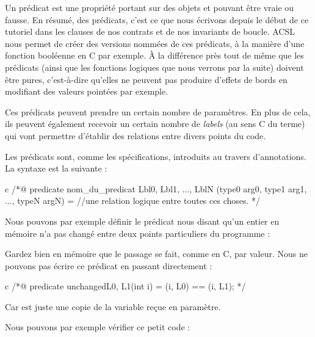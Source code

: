 Un prédicat est une propriété portant sur des objets et pouvant être vraie ou
fausse. En résumé, des prédicats, c'est ce que nous écrivons depuis le début de
ce tutoriel dans les clauses de nos contrats et de nos invariants de boucle.
ACSL nous permet de créer des versions nommées de ces prédicats, à la manière
d'une fonction booléenne en C par exemple. À la différence près tout de même que
les prédicats (ainsi que les fonctions logiques que nous verrons par la suite)
doivent être pures, c'est-à-dire qu'elles ne peuvent pas produire d'effets de
bords en modifiant des valeurs pointées par exemple.



Ces prédicats peuvent prendre un certain nombre de paramètres. En plus de cela,
ils peuvent également recevoir un certain nombre de \textit{labels} (au sens C du terme)
qui vont permettre d'établir des relations entre divers points du code.





Les prédicats sont, comme les spécifications, introduits au travers
d'annotations. La syntaxe est la suivante :



\begin{CodeBlock}{c}
  /*@
  predicate nom_du_predicat { Lbl0, Lbl1, ..., LblN }(type0 arg0, type1 arg1, ..., typeN argN) =
  //une relation logique entre toutes ces choses.
  */
\end{CodeBlock}



Nous pouvons par exemple définir le prédicat nous disant qu'un entier en mémoire n'a
pas changé entre deux points particuliers du programme :




\begin{Warning}
  Gardez bien en mémoire que le passage se fait, comme en C, par valeur. Nous ne
  pouvons pas écrire ce prédicat en passant directement  :

  \begin{CodeBlock}{c}
    /*@
    predicate unchanged{L0, L1}(int i) =
    \at(i, L0) == \at(i, L1);
    */
  \end{CodeBlock}

  Car  est juste une copie de la variable reçue en paramètre.
\end{Warning}


Nous pouvons par exemple vérifier ce petit code :


